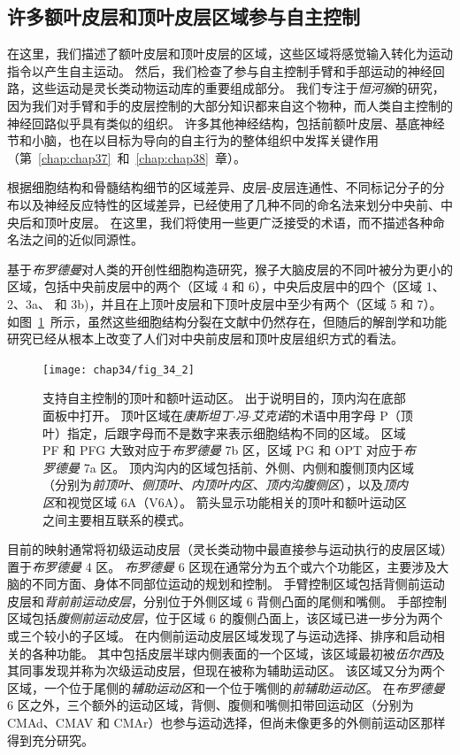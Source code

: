 \subsection{许多额叶皮层和顶叶皮层区域参与自主控制}

在这里，我们描述了额叶皮层和顶叶皮层的区域，这些区域将感觉输入转化为运动指令以产生自主运动。
然后，我们检查了参与自主控制手臂和手部运动的神经回路，这些运动是灵长类动物运动库的重要组成部分。
我们专注于\textit{恒河猴}的研究，因为我们对手臂和手的皮层控制的大部分知识都来自这个物种，而人类自主控制的神经回路似乎具有类似的组织。
许多其他神经结构，包括前额叶皮层、基底神经节和小脑，也在以目标为导向的自主行为的整体组织中发挥关键作用（第~\ref{chap:chap37}~和~\ref{chap:chap38}~章）。


根据细胞结构和骨髓结构细节的区域差异、皮层-皮层连通性、不同标记分子的分布以及神经反应特性的区域差异，已经使用了几种不同的命名法来划分中央前、中央后和顶叶皮层。
在这里，我们将使用一些更广泛接受的术语，而不描述各种命名法之间的近似同源性。


基于\textit{布罗德曼}对人类的开创性细胞构造研究，猴子大脑皮层的不同叶被分为更小的区域，包括中央前皮层中的两个（区域 4 和 6），中央后皮层中的四个（区域 1、2、3a、 和 3b)，并且在上顶叶皮层和下顶叶皮层中至少有两个（区域 5 和 7）。
如图~\ref{fig:34_2}~所示，虽然这些细胞结构分裂在文献中仍然存在，但随后的解剖学和功能研究已经从根本上改变了人们对中央前皮层和顶叶皮层组织方式的看法。


\begin{figure}[htbp]
	\centering
	\texttt{[image: chap34/fig\_34\_2]}
	\caption{支持自主控制的顶叶和额叶运动区。
		出于说明目的，顶内沟在底部面板中打开。
		顶叶区域在\textit{康斯坦丁$\cdot$冯$\cdot$艾克诺}的术语中用字母 P（顶叶）指定，后跟字母而不是数字来表示细胞结构不同的区域。
		区域 PF 和 PFG 大致对应于\textit{布罗德曼} 7b 区，区域 PG 和 OPT 对应于\textit{布罗德曼} 7a 区。
		顶内沟内的区域包括前、外侧、内侧和腹侧顶内区域（分别为\textit{前顶叶}、\textit{侧顶叶}、\textit{内顶叶内区}、\textit{顶内沟腹侧区}），以及\textit{顶内区}和视觉区域 6A（V6A）。
		箭头显示功能相关的顶叶和额叶运动区之间主要相互联系的模式。}
	\label{fig:34_2}
\end{figure}


目前的映射通常将初级运动皮层（灵长类动物中最直接参与运动执行的皮层区域）置于\textit{布罗德曼} 4 区。
\textit{布罗德曼} 6 区现在通常分为五个或六个功能区，主要涉及大脑的不同方面、身体不同部位运动的规划和控制。
手臂控制区域包括背侧前运动皮层和\textit{背前前运动皮层}，分别位于外侧区域 6 背侧凸面的尾侧和嘴侧。
手部控制区域包括\textit{腹侧前运动皮层}，位于区域 6 的腹侧凸面上，该区域已进一步分为两个或三个较小的子区域。
在内侧前运动皮层区域发现了与运动选择、排序和启动相关的各种功能。
其中包括皮层半球内侧表面的一个区域，该区域最初被\textit{伍尔西}及其同事发现并称为次级运动皮层，但现在被称为辅助运动区。
该区域又分为两个区域，一个位于尾侧的\textit{辅助运动区}和一个位于嘴侧的\textit{前辅助运动区}。
在\textit{布罗德曼} 6 区之外，三个额外的运动区域，背侧、腹侧和嘴侧扣带回运动区（分别为 CMAd、CMAV 和 CMAr）也参与运动选择，但尚未像更多的外侧前运动区那样得到充分研究。


